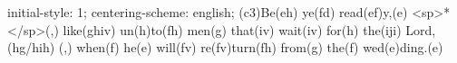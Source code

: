 initial-style: 1;
centering-scheme: english;
(c3)Be(eh) ye(fd) read(ef)y,(e) <sp>*</sp>(,) like(ghiv) un(h)to(fh) men(g) that(iv) wait(iv) for(h) the(iji) Lord,(hg/hih) (,) when(f) he(e) will(fv) re(fv)turn(fh) from(g) the(f) wed(e)ding.(e)

